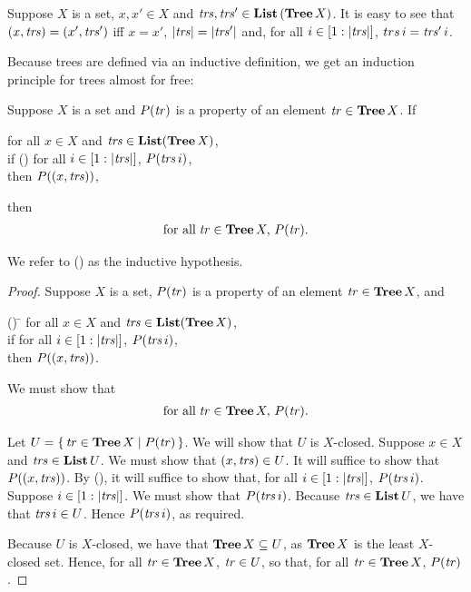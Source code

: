 Suppose $X$ is a set, $x,x'\in X$ and ${\it trs},{\it trs}'\in\mathbf{List}\,(\mathbf{Tree}\,X)$.
It is easy to see that $(x,{\it trs}) = (x',{\it trs}')$ iff $x=x'$, $|{\it trs}|=|{\it trs}'|$
and, for all $i\in[1:|{\it trs}|]$, $trs\,i = {\it trs}'\,i$.

Because trees are defined via an inductive definition, we
get an induction principle for trees almost for free:

\begin{theorem}
Suppose $X$ is a set and $P({\it tr})$ is a property of an element ${\it tr}\in\mathbf{Tree}\,X$.
If
\begin{ctabbing}
for all $x\in X$ and ${\it trs}\in\mathbf{List}(\mathbf{Tree}\,X)$, \\
if {\rm(\dag)} for all $i\in[1:|{\it trs}|]$, $P({\it trs}\,i)$, \\
then $P((x,{\it trs}))$,
\end{ctabbing}
then
\begin{gather*}
\allowbreak\mbox{for all}\allowbreak\;{\it tr}\in\mathbf{Tree}\,X,\,P({\it tr}) .
\end{gather*}
\end{theorem}

We refer to (\dag) as the inductive hypothesis.

\begin{proof}
Suppose $X$ is a set, $P({\it tr})$ is a property of an element ${\it tr}\in\mathbf{Tree}\,X$,
and
\begin{ctabbing}
(\ddag) \=\+ for all $x\in X$ and ${\it trs}\in\mathbf{List}(\mathbf{Tree}\,X)$, \\
if for all $i\in[1:|{\it trs}|]$, $P({\it trs}\,i)$, \\
then $P((x,{\it trs}))$.
\end{ctabbing}
We must show that
\begin{gather*}
\allowbreak\mbox{for all}\allowbreak\;{\it tr}\in\mathbf{Tree}\,X,\,P({\it tr}) .
\end{gather*}

Let $U=\{ \, {\it tr}\in\mathbf{Tree}\,X \mid P({\it tr}) \, \}$.
We will show that $U$ is $X$-closed.
Suppose $x\in X$ and ${\it trs}\in\mathbf{List}\,U$.  We must show
that $(x,{\it trs})\in U$.
It will suffice to show that $P((x,{\it trs}))$.
By (\ddag), it will suffice to show that, for all $i\in[1:|{\it trs}|]$,
$P({\it trs}\,i)$.
Suppose $i\in[1:|{\it trs}|]$.  We must show that
$P({\it trs}\,i)$.
Because ${\it trs}\in\mathbf{List}\,U$, we have that
${\it trs}\,i\in U$.
Hence $P({\it trs}\,i)$, as required.

Because $U$ is $X$-closed, we have that $\mathbf{Tree}\,X\subseteq U$, as
$\mathbf{Tree}\,X$ is the least $X$-closed set.  Hence, for all
${\it tr}\in\mathbf{Tree}\,X$, ${\it tr}\in U$, so that, for all ${\it tr}\in\mathbf{Tree}\,X$,
$P({\it tr})$.
\end{proof}

